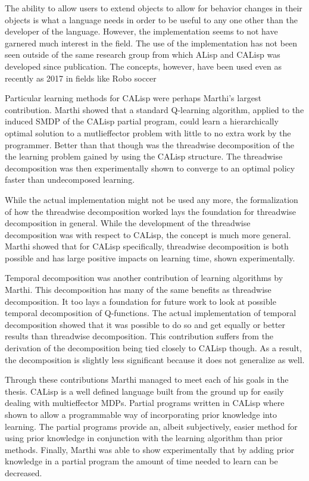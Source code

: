 \documentclass[jair,twoside,11pt,theapa]{article}
\begin{document}
The ability to allow users to extend objects to allow for behavior changes in their objects is what a language needs in order to be useful to any one other than the developer of the language. However, the implementation seems to not have garnered much interest in the field. The use of the implementation has not been seen outside of the same research group from which ALisp and CALisp was developed since publication. The concepts, however, have been used even as recently as 2017 in fields like Robo soccer \cite{CHRLKeepaway:2017}

Particular learning methods for CALisp were perhaps Marthi's largest contribution. Marthi showed that a standard Q-learning algorithm, applied to the induced SMDP of the CALisp partial program, could learn a hierarchically optimal solution to a mutlieffector problem with little to no extra work by the programmer. Better than that though was the threadwise decomposition of the the learning problem gained by using the CALisp structure. The threadwise decomposition was then experimentally shown to converge to an optimal policy faster than undecomposed learning. 

While the actual implementation might not be used any more, the formalization of how the threadwise decomposition worked lays the foundation for threadwise decomposition in general. While the development of the threadwise decomposition was with respect to CALisp, the concept is much more general. Marthi showed that for CALisp specifically, threadwise decomposition is both possible and has large positive impacts on learning time, shown experimentally.  

Temporal decomposition was another contribution of learning algorithms by Marthi. This decomposition has many of the same benefits as threadwise decomposition. It too lays a foundation for future work to look at possible temporal decomposition of Q-functions. The actual implementation of temporal decomposition showed that it was possible to do so and get equally or better results than threadwise decomposition. This contribution suffers from the derivation of the decomposition being tied closely to CALisp though. As a result, the decomposition is slightly less significant because it does not generalize as well.

Through these contributions Marthi managed to meet each of his goals in the thesis. CALisp is a well defined language built from the ground up for easily dealing with multieffector MDPs. Partial programs written in CALisp where shown to allow a programmable way of incorporating prior knowledge into learning. The partial programs provide an, albeit subjectively, easier method for using prior knowledge in conjunction with the learning algorithm than prior methods. Finally, Marthi was able to show experimentally that by adding prior knowledge in a partial program the amount of time needed to learn can be decreased. 
\end{document}
